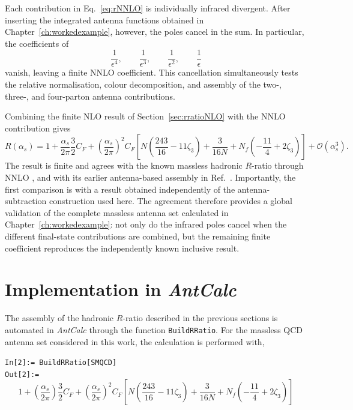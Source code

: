Each contribution in Eq.~\eqref{eq:rNNLO} is individually infrared divergent. After inserting the
integrated antenna functions obtained in Chapter~\ref{ch:workedexample}, however, the poles cancel in
the sum. In particular, the coefficients of
\begin{equation*}
    \frac1{\epsilon^4},\qquad\frac1{\epsilon^3},\qquad\frac1{\epsilon^2},\qquad\frac1\epsilon
\end{equation*}
vanish, leaving a finite NNLO coefficient. This cancellation simultaneously tests the relative
normalisation, colour decomposition, and assembly of the two-, three-, and four-parton antenna
contributions.

Combining the finite NLO result of Section~\ref{sec:rratioNLO} with the NNLO contribution gives
\begin{equation}\label{eq:RfinalResult}
    R(\alpha_s) = 1+\frac{\alpha_s}{2\pi}\frac32C_F+\left(\frac{\alpha_s}{2\pi}\right)^2C_F\!\left[N\left(\frac{243}{16}-11\zeta_3\right)+\frac3{16N}+N_f\left(-\frac{11}4+2\zeta_3\right)\right]+\mathcal O\!\left(\alpha_s^3\right).
\end{equation}
The result is finite and agrees with the known massless hadronic $R$-ratio through NNLO
\cite{Dine:1979qh}, and with its earlier antenna-based assembly in Ref.~\cite{Gehrmann-DeRidder:2004ttg}. Importantly, the first comparison is with a result obtained
independently of the antenna-subtraction construction used here. The agreement therefore provides a
global validation of the complete massless antenna set calculated in
Chapter~\ref{ch:workedexample}: not only do the infrared poles cancel when the different final-state
contributions are combined, but the remaining finite coefficient reproduces the independently known
inclusive result.

\section{Implementation in \textit{AntCalc}}\label{sec:rratioImpl}

The assembly of the hadronic $R$-ratio described in the previous sections is automated in
\textit{AntCalc} through the function \texttt{BuildRRatio}. For the massless QCD antenna set
considered in this work, the calculation is performed with,

\begin{mdframed}[backgroundcolor=gray!10, linewidth=0pt]
\texttt{In[2]:= BuildRRatio[SMQCD]}\\
\hfill
\texttt{Out[2]:=}
    \begin{equation*}
        1+\left(\frac{\alpha_s}{2\pi}\right)\frac32C_F+\left(\frac{\alpha_s}{2\pi}\right)^2C_F\!\left[N\left(\frac{243}{16}-11\zeta_3\right)+\frac3{16N}+N_f\left(-\frac{11}4+2\zeta_3\right)\right]
    \end{equation*}
\end{mdframed}

